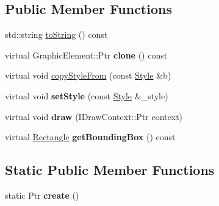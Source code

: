 \subsection*{Public Member Functions}
\begin{DoxyCompactItemize}
\item 
std::string \hyperlink{classsambag_1_1disco_1_1graphic_elements_1_1_compound_a439be982b9afae50b0544569bf9af445}{toString} () const 
\item 
\hypertarget{classsambag_1_1disco_1_1graphic_elements_1_1_compound_a0d0220e41685f8d1eecd433cec9efd37}{
virtual GraphicElement::Ptr {\bfseries clone} () const }
\label{classsambag_1_1disco_1_1graphic_elements_1_1_compound_a0d0220e41685f8d1eecd433cec9efd37}

\item 
virtual void \hyperlink{classsambag_1_1disco_1_1graphic_elements_1_1_compound_a7a36ede1ba0ed02f7928d03a8dbaa36e}{copyStyleFrom} (const \hyperlink{classsambag_1_1disco_1_1graphic_elements_1_1_style}{Style} \&b)
\item 
\hypertarget{classsambag_1_1disco_1_1graphic_elements_1_1_compound_af5d80d77106b3bed9da7941d3cc94785}{
virtual void {\bfseries setStyle} (const \hyperlink{classsambag_1_1disco_1_1graphic_elements_1_1_style}{Style} \&\_\-style)}
\label{classsambag_1_1disco_1_1graphic_elements_1_1_compound_af5d80d77106b3bed9da7941d3cc94785}

\item 
\hypertarget{classsambag_1_1disco_1_1graphic_elements_1_1_compound_a67b83de2dd7a640751eb5911d3cbfbea}{
virtual void {\bfseries draw} (IDrawContext::Ptr context)}
\label{classsambag_1_1disco_1_1graphic_elements_1_1_compound_a67b83de2dd7a640751eb5911d3cbfbea}

\item 
\hypertarget{classsambag_1_1disco_1_1graphic_elements_1_1_compound_a280b0ff0aeec431bc2c4ff40a62ca84c}{
virtual \hyperlink{classsambag_1_1com_1_1_rectangle}{Rectangle} {\bfseries getBoundingBox} () const }
\label{classsambag_1_1disco_1_1graphic_elements_1_1_compound_a280b0ff0aeec431bc2c4ff40a62ca84c}

\end{DoxyCompactItemize}
\subsection*{Static Public Member Functions}
\begin{DoxyCompactItemize}
\item 
\hypertarget{classsambag_1_1disco_1_1graphic_elements_1_1_compound_a621edf232bd598eaadeccbffec3556eb}{
static Ptr {\bfseries create} ()}
\label{classsambag_1_1disco_1_1graphic_elements_1_1_compound_a621edf232bd598eaadeccbffec3556eb}

\end{DoxyCompactItemize}



